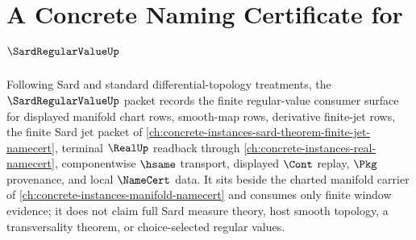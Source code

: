 \chapter{A Concrete Naming Certificate for $\SardRegularValueUp$}
\label{ch:concrete-instances-sard-regular-value-namecert}

Following Sard and standard differential-topology treatments, the $\SardRegularValueUp$ packet records the finite regular-value consumer surface for displayed manifold chart rows, smooth-map rows, derivative finite-jet rows, the finite Sard jet packet of \autoref{ch:concrete-instances-sard-theorem-finite-jet-namecert}, terminal $\RealUp$ readback through \autoref{ch:concrete-instances-real-namecert}, componentwise $\hsame$ transport, displayed $\Cont$ replay, $\Pkg$ provenance, and local $\NameCert$ data. It sits beside the charted manifold carrier of \autoref{ch:concrete-instances-manifold-namecert} and consumes only finite window evidence; it does not claim full Sard measure theory, host smooth topology, a transversality theorem, or choice-selected regular values.

